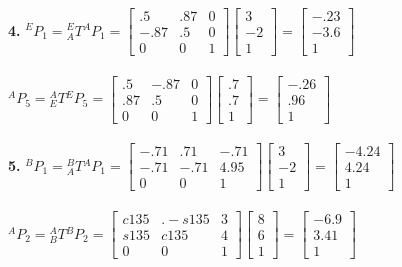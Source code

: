 \documentclass{article}
\begin{document}
\textbf{4. }
${}^EP_1={}^E_AT{}^AP_1=\begin{bmatrix}
.5 & .87 & 0\\
-.87 & .5 & 0\\
0 & 0 & 1
\end{bmatrix}\begin{bmatrix}
3\\
-2\\
1
\end{bmatrix}=\begin{bmatrix}
-.23\\
-3.6\\
1
\end{bmatrix}$\\\\
${}^AP_5={}^A_ET{}^EP_5=\begin{bmatrix}
.5 & -.87 & 0\\
.87 & .5 & 0\\
0 & 0 & 1
\end{bmatrix}\begin{bmatrix}
.7\\
.7\\
1
\end{bmatrix}=\begin{bmatrix}
-.26\\
.96\\
1
\end{bmatrix}$\\\\
\textbf{5. }
${}^BP_1={}^B_AT{}^AP_1=\begin{bmatrix}
-.71 & .71 & -.71\\
-.71 & -.71 & 4.95\\
0 & 0 & 1
\end{bmatrix}\begin{bmatrix}
3\\
-2\\
1
\end{bmatrix}=\begin{bmatrix}
-4.24\\
4.24\\
1
\end{bmatrix}$\\\\
${}^AP_2={}^A_BT{}^BP_2=\begin{bmatrix}
c135 & .-s135 & 3\\
s135 & c135 & 4\\
0 & 0 & 1
\end{bmatrix}\begin{bmatrix}
8\\
6\\
1
\end{bmatrix}=\begin{bmatrix}
-6.9\\
3.41\\
1
\end{bmatrix}$\\\\
\end{document}
